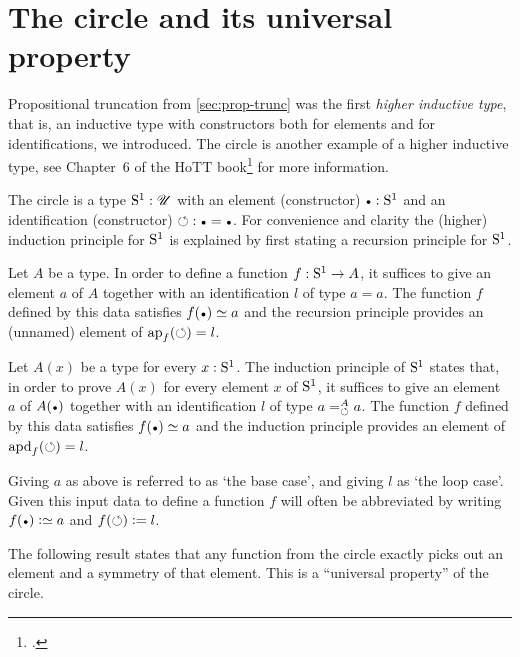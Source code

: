 \section{The circle and its universal property}
\label{sec:S1}

Propositional truncation from \cref{sec:prop-trunc} was
the first \emph{higher inductive type}, that is, an inductive type
with constructors both for elements and for identifications,
we introduced. 
The circle is another example of a higher inductive type,
see Chapter~6 of the HoTT book\footcite{hottbook} for more information.

\begin{definition}
  \label{def:circle}
The circle is a type ${\mathrm{S}^1}:{\mathscr{U}}$ with an element (constructor) $\base : \Sc$ and 
an identification (constructor) ${\Sloop}: \base=\base$. For convenience and
clarity the (higher) induction principle for ${\mathrm{S}^1}$ is explained
by first stating a recursion principle for ${\mathrm{S}^1}$.

Let $A$ be a type. In order to define a function $f:{\mathrm{S}^1}\to A$,
it suffices to give an element $a$ of $A$ together with an
identification $l$ of type $a=a$. The function $f$ defined
by this data satisfies $f(\base)\jdeq a$ and 
the recursion principle provides an (unnamed) element of 
$\ap{f}(\Sloop)=l$.

Let $A(x)$ be a type for every $x:{\mathrm{S}^1}$. The induction principle of ${\mathrm{S}^1}$
states that, in order to prove $A(x)$ for every element $x$ of ${\mathrm{S}^1}$,
it suffices to give an element $a$ of $A(\base)$ together with an
identification $l$ of type $\pathover{a}{A}{\Sloop}{a}$. 
The function $f$ defined by this data satisfies $f(\base)\jdeq a$ and 
the induction principle provides an element of $\apd{f}(\Sloop)=l$.
\end{definition}

Giving $a$ as above is referred to as `the base case', and
giving $l$ as `the loop case'. Given this input data to define
a function $f$ will often be abbreviated by writing
$f(\base)\defeq a$ and $f(\circlearrowleft)\mathrel{\vcentcolon=} l$.

The following result states that any function from the circle exactly 
picks out an element and a symmetry of that element.
This is a ``universal property'' of the circle.

